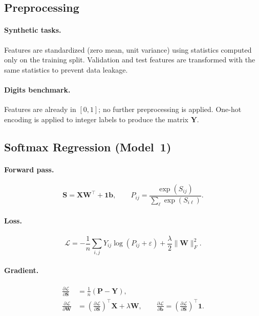 \documentclass[11pt]{article}
\newcommand{\W}{\mathbf{W}}
\newcommand{\bb}{\mathbf{b}}
\newcommand{\bX}{\mathbf{X}}
\newcommand{\bS}{\mathbf{S}}
\newcommand{\bP}{\mathbf{P}}
\newcommand{\bY}{\mathbf{Y}}
\newcommand{\loss}{\mathcal{L}}
\begin{document}
\subsection{Preprocessing}

\paragraph{Synthetic tasks.}
Features are standardized (zero mean, unit variance) using statistics computed
only on the training split.
Validation and test features are transformed with the same statistics to
prevent data leakage.

\paragraph{Digits benchmark.}
Features are already in $[0,1]$; no further preprocessing is applied.
One-hot encoding is applied to integer labels to produce the matrix $\bY$.

\subsection{Softmax Regression (Model~1)}

\paragraph{Forward pass.}
\[
  \bS=\bX\W^{\top}+\mathbf{1}\bb,\qquad
  P_{ij}=\frac{\exp(S_{ij})}{\sum_{\ell}\exp(S_{i\ell})}.
\]

\paragraph{Loss.}
\[
  \loss=-\frac{1}{n}\sum_{i,j}Y_{ij}\log(P_{ij}+\varepsilon)
         +\frac{\lambda}{2}\|\W\|_F^2.
\]

\paragraph{Gradient.}
\begin{align*}
  \frac{\partial\loss}{\partial\bS}
    &=\frac{1}{n}(\bP-\bY),\\
  \frac{\partial\loss}{\partial\W}
    &=\!\left(\frac{\partial\loss}{\partial\bS}\right)^{\!\top}\!\bX
      +\lambda\W,\qquad
  \frac{\partial\loss}{\partial\bb}
    =\!\left(\frac{\partial\loss}{\partial\bS}\right)^{\!\top}\!\mathbf{1}.
\end{align*}
\end{document}
